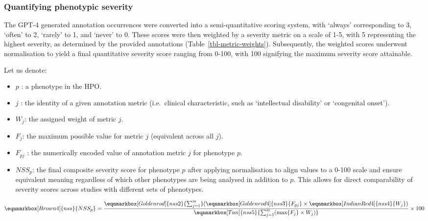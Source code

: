 \documentclass[
]{agujournal2019}
\begin{document}
\subsubsection{Quantifying phenotypic
severity}\label{quantifying-phenotypic-severity-1}

The GPT-4 generated annotation occurrences were converted into a
semi-quantitative scoring system, with `always' corresponding to 3,
`often' to 2, `rarely' to 1, and `never' to 0. These scores were then
weighted by a severity metric on a scale of 1-5, with 5 representing the
highest severity, as determined by the provided annotations
(Table~\ref{tbl-metric-weights}). Subsequently, the weighted scores
underwent normalisation to yield a final quantitative severity score
ranging from 0-100, with 100 signifying the maximum severity score
attainable.

Let us denote:

\begin{itemize}
\item
  \(p\) : a phenotype in the HPO.
\item
  \(j\) : the identity of a given annotation metric (i.e.~clinical
  characteristic, such as `intellectual disability' or `congenital
  onset').
\item
  \(W_j\): the assigned weight of metric \(j\).
\item
  \(F_j\): the maximum possible value for metric \(j\) (equivalent
  across all \(j\)).
\item
  \(F_{pj}\) : the numerically encoded value of annotation metric \(j\)
  for phenotype \(p\).
\item
  \(NSS_p\): the final composite severity score for phenotype \(p\)
  after applying normalisation to align values to a 0-100 scale and
  ensure equivalent meaning regardless of which other phenotypes are
  being analysed in addition to \(p\). This allows for direct
  comparability of severity scores across studies with different sets of
  phenotypes.
\end{itemize}

\hfill\break
\hfill\break

\begin{equation*}
  \eqnmarkbox[Brown4]{nss}{NSS_p}
  =
  \frac{ 
    \eqnmarkbox[Goldenrod]{nss2}{\sum_{j=1}^{m}} 
    (
      \eqnmarkbox[Goldenrod4]{nss3}{F_{pj}}
      \times 
      \eqnmarkbox[IndianRed4]{nss4}{W_j}
    )
    }{
    \eqnmarkbox[Tan]{nss5}{\sum_{j=1}^{m}(\max\{F_j\} \times W_j)} 
  } \times 100
\end{equation*}
\end{document}
